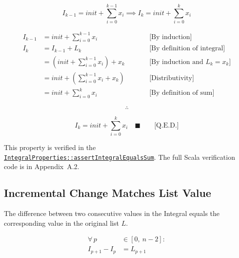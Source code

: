 \begin{equation*}
I_{k-1} = \mathit{init} + \sum_{i=0}^{k-1} x_i
  \implies I_k = \mathit{init} + \sum_{i=0}^{k} x_i
\end{equation*}

\begin{equation*}
\begin{aligned}
I_{k-1} &= \mathit{init} + \sum_{i=0}^{k-1} x_i
  & \qquad &\text{[By induction]} \\
I_k &= I_{k-1} + L_k
  & \qquad &\text{[By definition of integral]} \\
    &= \left(\mathit{init} + \sum_{i=0}^{k-1} x_i\right) + x_k
  & \qquad &\text{[By induction and } L_k = x_k]  \\
    &= \mathit{init} + \left(\sum_{i=0}^{k-1} x_i + x_k\right)
  & \qquad &\text{[Distributivity]} \\
    &= \mathit{init} + \sum_{i=0}^{k} x_i
  & \qquad &\text{[By definition of sum]}
\end{aligned}
\end{equation*}

\begin{equation*}
\therefore
\end{equation*}

\begin{equation*}
I_k = \mathit{init} + \sum_{i=0}^{k} x_i \quad \blacksquare \qquad
  \text{[Q.E.D.]}
\end{equation*}

{\raggedright
This property is verified in the
\href{https://github.com/thiagomata/prime-numbers/blob/master/src/main/scala/v1/chapter3/list/integral/properties/IntegralProperties.scala}{\texttt{IntegralProperties::\allowbreak assertIntegralEqualsSum}}.
The full Scala verification code is in Appendix~A.2.
\par}

\subsection{Incremental Change Matches List Value}
\label{sec:incremental-change}

The difference between two consecutive values in the Integral equals the
corresponding value in the original list $L$.

\begin{equation*}
\begin{aligned}
\forall\, p &\in [0,\ n-2]: \\
I_{p+1} - I_p &= L_{p+1}
\end{aligned}
\end{equation*}

